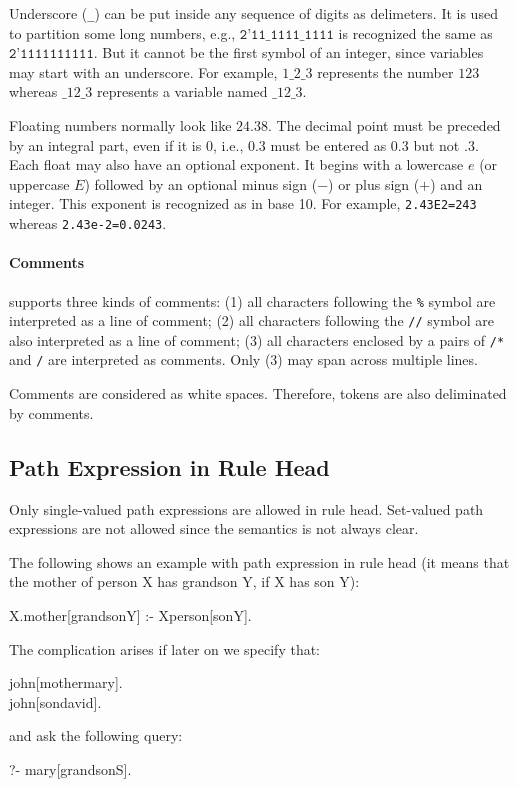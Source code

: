 \documentclass[11pt]{report}
\begin{document}
Underscore (\texttt{\_}) can be put inside any sequence of digits as delimeters. It is used
to partition some long numbers, e.g., $\texttt{2'11\_1111\_1111}$ is recognized the same as
$\texttt{2'1111111111}$. But it cannot be the first symbol of an integer, since variables may
start with an underscore. For example, $1\_2\_3$ represents the number $123$ whereas $\_12\_3$
represents a variable named $\_12\_3$.

Floating numbers normally look like $24.38$. The decimal point must be preceded by an integral
part, even if it is $0$, i.e., $0.3$ must be entered as $0.3$ but not $.3$. Each float may also
have an optional exponent. It begins with a lowercase $e$ (or uppercase $E$) followed by an
optional minus sign ($-$) or plus sign ($+$) and an integer. This exponent is recognized as
in base 10. For example, \mbox{\tt 2.43E2=243} whereas \mbox{\tt 2.43e-2=0.0243}. 

\paragraph{Comments}

\FLORA supports three kinds of comments: (1) all characters following the {\tt \%} symbol are
interpreted as a line of comment; (2) all characters following the {\tt //} symbol are also
interpreted as a line of comment; (3) all characters enclosed by a pairs of {\tt /*} and
{\tt */} are interpreted as comments. Only (3) may span across multiple lines.

Comments are considered as white spaces. Therefore, tokens are also deliminated by comments.

\subsection{Path Expression in Rule Head}

Only single-valued path expressions are allowed in rule head. Set-valued path expressions
are not allowed since the semantics is not always clear.

The following shows an example with path expression in rule head (it means that the mother
of person X has grandson Y, if X has son Y):
\begin{qrules}
X.mother[grandson{\mvd}Y] :- X{\isa}person[son{\mvd}Y].
\end{qrules}
The complication arises if later on we specify that:
\begin{qrules}
john[mother{\fd}mary]. \\
john[son{\mvd}david].
\end{qrules}
and ask the following query:
\begin{qrules}
?- mary[grandson{\mvd}S].
\end{qrules}
\end{document}
